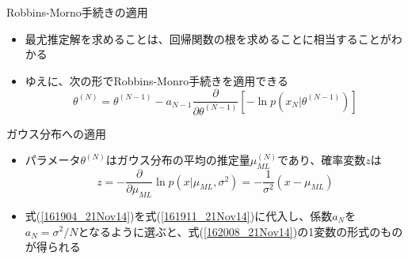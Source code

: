\begin{frame}{Robbins-Morno手続きの適用}
 \begin{itemize}
  \item 最尤推定解を求めることは、回帰関数の根を求めることに相当することがわかる
  \item ゆえに、次の形でRobbins-Monro手続きを適用できる
        \begin{equation}
         \theta^{(N)}=\theta^{(N-1)}-a_{N-1}\frac{\partial}{\partial \theta^{(N-1)}}[-\ln p(x_N|\theta^{(N-1)})]\label{161911_21Nov14}
        \end{equation}
 \end{itemize}
\end{frame}

\begin{frame}{ガウス分布への適用}
 \begin{itemize}
  \item パラメータ$\theta^{(N)}$はガウス分布の平均の推定量$\mu_{ML}^{(N)}$であり、確率変数$z$は
        \begin{equation}
         z=-\frac{\partial}{\partial \mu_{ML}} \ln p(x|\mu_{ML}, \sigma^2) = -\frac{1}{\sigma^2}(x-\mu_{ML})\label{161904_21Nov14}
        \end{equation}
  \item 式(\ref{161904_21Nov14})を式(\ref{161911_21Nov14})に代入し、係数$a_N$を$a_N=\sigma^2/N$となるように選ぶと、式(\ref{162008_21Nov14})の1変数の形式のものが得られる
 \end{itemize}
\end{frame}
